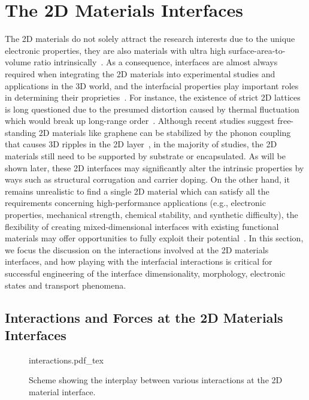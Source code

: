 \section{The 2D Materials Interfaces}
\label{sec:2d-mater-interf}
The 2D materials do not solely attract the research interests due to
the unique electronic properties, they are also materials with ultra
high surface-area-to-volume ratio
intrinsically~\cite{Liu_2018_rev,Novoselov_2016_vdW}.
%
As a consequence,
interfaces are almost always required when integrating the 2D
materials into experimental studies and applications in the 3D world,
and the interfacial properties play important roles in determining
their proprieties~\cite{Liu_2018_rev}.
% 
For instance, the existence of strict 2D lattices is long questioned
due to the presumed distortion caused by thermal fluctuation which
would break up long-range
order~\cite{Peierls_1935_unstable,landau_statistical_2009}.
%
Although recent studies suggest free-standing 2D materials like
graphene can be stabilized by the phonon coupling that causes 3D
ripples in the 2D
layer~\cite{Fasolino_2007_ripple,Brivio_2011_mos2_ripple}, in the
majority of studies, the 2D materials still need to be supported by
substrate or encapsulated.  As will be shown later, these 2D
interfaces may significantly alter the intrinsic properties by ways
such as structural corrugation and carrier doping.
%
On the other hand, it remains unrealistic to find a single 2D material
which can satisfy all the requirements concerning high-performance
applications (e.g., electronic properties, mechanical strength,
chemical stability, and synthetic difficulty), the flexibility of
creating mixed-dimensional interfaces with existing functional
materials may offer opportunities to fully exploit their
potential~\cite{Jariwala_2016_mixed_vdw_het}.
%
In this section, we focus the discussion on the
interactions involved at the 2D materials interfaces,
and how playing with the
interfacial interactions is critical for successful engineering of the
interface dimensionality, morphology, electronic states and transport
phenomena.

\subsection{Interactions and Forces at the 2D Materials Interfaces}
\label{sec:inter-forc-at}

\begin{figure}[htbp]
  \centering
  {interactions.pdf_tex}
  \caption{\label{fig:intro-interactions} %
    Scheme showing the interplay between various interactions at the
    2D material interface.
  }
\end{figure}


